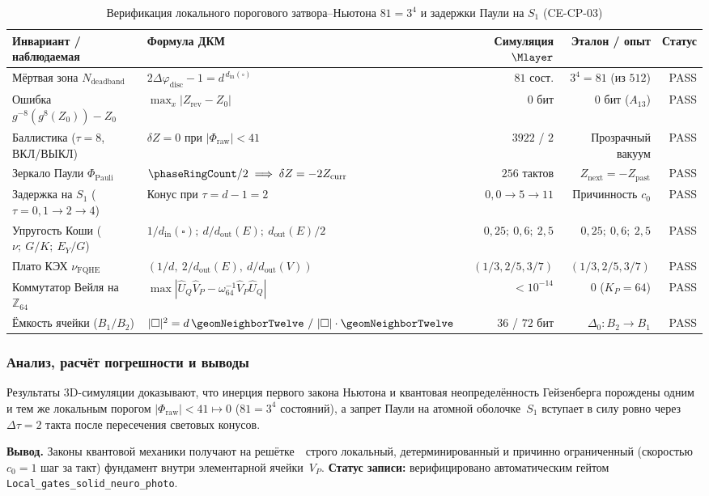 \begin{table}[htbp]
\centering
\scriptsize
\setlength{\tabcolsep}{2pt}
\caption{Верификация локального порогового затвора--Ньютона $81=3^4$ и задержки Паули на $S_1$ (CE-CP-03)}
\label{tab:exp-ce-cp-03}
\begin{tabular}{@{}llrrr@{}}
\toprule
Инвариант / наблюдаемая & Формула ДКМ & Симуляция $\Mlayer$ & Эталон / опыт & Статус \\
\midrule
Мёртвая зона $N_{\mathrm{deadband}}$ & $2\Delta\varphi_{\mathrm{disc}} - 1 = d^{\,d_{\mathrm{in}}(\square)}$ & $81$ сост. & $3^4 = 81$ (из $512$) & PASS \\
Ошибка $g^{-8}(g^8(Z_0)) - Z_0$ & $\max_x |Z_{\mathrm{rev}} - Z_0|$ & $0$ бит & $0$ бит ($A_{13}$) & PASS \\
Баллистика ($\tau=8$, ВКЛ/ВЫКЛ) & $\delta Z = 0$ при $|\Phi_{\mathrm{raw}}| < 41$ & $3922$ / $2$ & Прозрачный вакуум & PASS \\
Зеркало Паули $\Phi_{\mathrm{Pauli}}$ & $\phaseRingCount / 2 \implies \delta Z = -2Z_{\mathrm{curr}}$ & $256$ тактов & $Z_{\mathrm{next}} = -Z_{\mathrm{past}}$ & PASS \\
Задержка на $S_1$ ($\tau=0,1\to 2\to 4$) & Конус при $\tau = d-1 = 2$ & $0,0 \to 5 \to 11$ & Причинность $c_0$ & PASS \\
Упругость Коши ($\nu;\ G/K;\ E_Y/G$) & $1/d_{\mathrm{in}}(\square);\ d/d_{\mathrm{out}}(E);\ d_{\mathrm{out}}(E)/2$ & $0{,}25;\ 0{,}6;\ 2{,}5$ & $0{,}25;\ 0{,}6;\ 2{,}5$ & PASS \\
Плато КЭХ $\nu_{\mathrm{FQHE}}$ & $(1/d,\ 2/d_{\mathrm{out}}(E),\ d/d_{\mathrm{out}}(V))$ & $(1/3, 2/5, 3/7)$ & $(1/3, 2/5, 3/7)$ & PASS \\
Коммутатор Вейля на $\mathbb{Z}_{64}$ & $\max|\hat{U}_Q\hat{V}_P - \omega_{64}^{-1}\hat{V}_P\hat{U}_Q|$ & $< 10^{-14}$ & $0$ ($K_P = 64$) & PASS \\
Ёмкость ячейки ($B_1 / B_2$) & $|\square|^2 = d\,\geomNeighborTwelve\ /\ |\square|\cdot\geomNeighborTwelve$ & $36$ / $72$ бит & $\Delta_0\colon B_2\to B_1$ & PASS \\
\bottomrule
\end{tabular}
\end{table}

\subsubsection*{Анализ, расчёт погрешности и выводы}
Результаты 3D-симуляции доказывают, что инерция первого закона Ньютона и квантовая неопределённость Гейзенберга порождены одним и тем же локальным порогом $|\Phi_{\mathrm{raw}}| < 41 \mapsto 0$ ($81 = 3^4$ состояний), а запрет Паули на атомной оболочке~$S_1$ вступает в силу ровно через $\Delta\tau = 2$ такта после пересечения световых конусов.

\textbf{Вывод.}
Законы квантовой механики получают на решётке~\latGCKshort\ строго локальный, детерминированный и причинно ограниченный (скоростью $c_0 = 1$ шаг за такт) фундамент внутри элементарной ячейки~$V_P$.
\textbf{Статус записи:} верифицировано автоматическим гейтом \texttt{Local\_gates\_solid\_neuro\_photo}.
